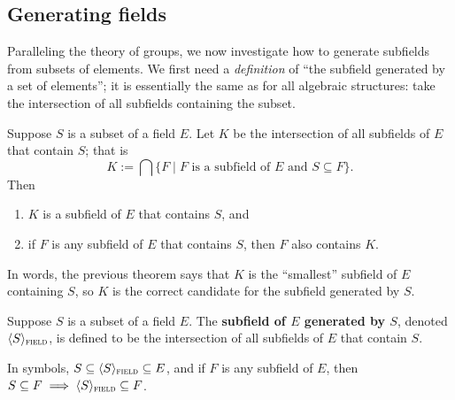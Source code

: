 \subsection{Generating fields}
Paralleling the theory of groups, we now investigate how to generate subfields from subsets of elements. We first need a \emph{definition} of ``the subfield generated by a set of elements'';  it is essentially the same as for all algebraic structures: take the intersection of all subfields containing the subset.

\begin{theorem}\label{thm.IntersectFields}
Suppose $S$ is a subset of a field $E$. Let $K$ be the intersection of all subfields of $E$ that contain $S$; that is \[K:=\bigcap\{F\mid \text{$F$ is a subfield of $E$ and  $S\subseteq F$}\}.\]
Then 
\begin{enumerate}
\item $K$ is a subfield of $E$ that contains $S$, and
\item if $F$ is any subfield of $E$ that contains $S$, then $F$ also contains $K$.
\end{enumerate}
\end{theorem}

In words, the previous theorem says that $K$ is the ``smallest'' subfield of $E$ containing $S$, so  $K$ is the correct candidate for the subfield generated by $S$.

\begin{definition}\label{def.GenerateField}
Suppose $S$ is a subset of a field $E$. The \textbf{subfield of $E$ generated by $S$}, denoted $\langle S \rangle_{\textsc{field}}$, is defined to be the intersection of all subfields of $E$ that contain $S$.
\end{definition}

In symbols, $S \subseteq \langle S \rangle_{\textsc{field}} \subseteq E$, and if $F$ is any subfield of $E$, then $S\subseteq F\implies \langle S \rangle_{\textsc{field}} \subseteq F$.

